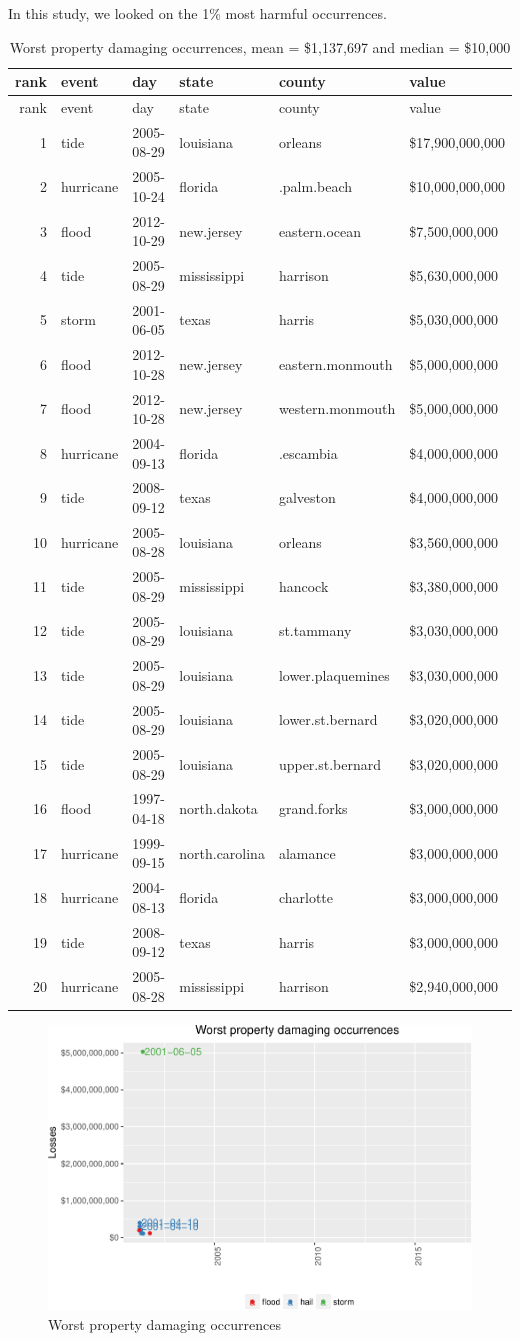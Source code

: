 \documentclass[]{article}
\begin{document}
In this study, we looked on the 1\% most harmful occurrences.

\begin{longtable}[]{@{}rlllll@{}}
\caption{Worst property damaging occurrences, mean = \$1,137,697 and
median = \$10,000}\tabularnewline
\toprule
rank & event & day & state & county & value\tabularnewline
\midrule
\endfirsthead
\toprule
rank & event & day & state & county & value\tabularnewline
\midrule
\endhead
1 & tide & 2005-08-29 & louisiana & orleans &
\$17,900,000,000\tabularnewline
2 & hurricane & 2005-10-24 & florida & .palm.beach &
\$10,000,000,000\tabularnewline
3 & flood & 2012-10-29 & new.jersey & eastern.ocean &
\$7,500,000,000\tabularnewline
4 & tide & 2005-08-29 & mississippi & harrison &
\$5,630,000,000\tabularnewline
5 & storm & 2001-06-05 & texas & harris & \$5,030,000,000\tabularnewline
6 & flood & 2012-10-28 & new.jersey & eastern.monmouth &
\$5,000,000,000\tabularnewline
7 & flood & 2012-10-28 & new.jersey & western.monmouth &
\$5,000,000,000\tabularnewline
8 & hurricane & 2004-09-13 & florida & .escambia &
\$4,000,000,000\tabularnewline
9 & tide & 2008-09-12 & texas & galveston &
\$4,000,000,000\tabularnewline
10 & hurricane & 2005-08-28 & louisiana & orleans &
\$3,560,000,000\tabularnewline
11 & tide & 2005-08-29 & mississippi & hancock &
\$3,380,000,000\tabularnewline
12 & tide & 2005-08-29 & louisiana & st.tammany &
\$3,030,000,000\tabularnewline
13 & tide & 2005-08-29 & louisiana & lower.plaquemines &
\$3,030,000,000\tabularnewline
14 & tide & 2005-08-29 & louisiana & lower.st.bernard &
\$3,020,000,000\tabularnewline
15 & tide & 2005-08-29 & louisiana & upper.st.bernard &
\$3,020,000,000\tabularnewline
16 & flood & 1997-04-18 & north.dakota & grand.forks &
\$3,000,000,000\tabularnewline
17 & hurricane & 1999-09-15 & north.carolina & alamance &
\$3,000,000,000\tabularnewline
18 & hurricane & 2004-08-13 & florida & charlotte &
\$3,000,000,000\tabularnewline
19 & tide & 2008-09-12 & texas & harris & \$3,000,000,000\tabularnewline
20 & hurricane & 2005-08-28 & mississippi & harrison &
\$2,940,000,000\tabularnewline
\bottomrule
\end{longtable}

\begin{figure}[htbp]
\centering
\includegraphics{readme_files/figure-latex/prop-single-plot-1.pdf}
\caption{Worst property damaging occurrences}
\end{figure}
\end{document}
